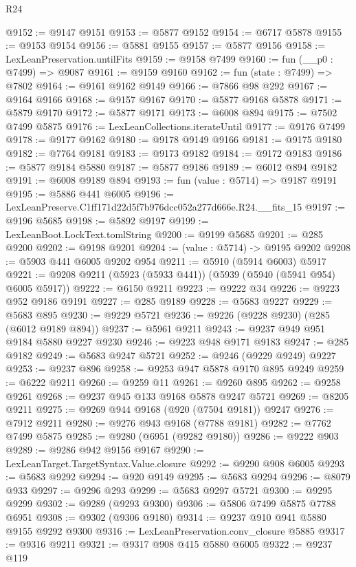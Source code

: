 \begin{lexlean}{R24}
\begin{coremodule}
@9152 := @9147 @9151
@9153 := @5877 @9152
@9154 := @6717 @5878
@9155 := @9153 @9154
@9156 := @5881 @9155
@9157 := @5877 @9156
@9158 := LexLeanPreservation.untilFits
@9159 := @9158 @7499
@9160 := fun (__p0 : @7499) => @9087
@9161 := @9159 @9160
@9162 := fun (state : @7499) => @7802
@9164 := @9161 @9162 @9149
@9166 := @7866 @98 @292
@9167 := @9164 @9166
@9168 := @9157 @9167
@9170 := @5877 @9168 @5878
@9171 := @5879 @9170
@9172 := @5877 @9171
@9173 := @6008 @894
@9175 := @7502 @7499 @5875
@9176 := LexLeanCollections.iterateUntil
@9177 := @9176 @7499
@9178 := @9177 @9162
@9180 := @9178 @9149 @9166
@9181 := @9175 @9180
@9182 := @7764 @9181
@9183 := @9173 @9182
@9184 := @9172 @9183
@9186 := @5877 @9184 @5880
@9187 := @5877 @9186
@9189 := @6012 @894 @9182
@9191 := @6008 @9189 @894
@9193 := fun (value : @5714) => @9187 @9191
@9195 := @5886 @441 @6005
@9196 := LexLeanPreserve.C1ff171d22d5f7b976dcc052a277d666e.R24.__fits_15
@9197 := @9196 @5685
@9198 := @5892 @9197
@9199 := LexLeanBoot.LockText.tomlString
@9200 := @9199 @5685
@9201 := @285 @9200
@9202 := @9198 @9201
@9204 := (value : @5714) -> @9195 @9202
@9208 := @5903 @441 @6005 @9202 @954
@9211 := @5910 (@5914 @6003) @5917
@9221 := @9208 @9211 (@5923 (@5933 @441)) (@5939 (@5940 (@5941 @954) @6005 @5917))
@9222 := @6150 @9211
@9223 := @9222 @34
@9226 := @9223 @952 @9186 @9191
@9227 := @285 @9189
@9228 := @5683 @9227
@9229 := @5683 @895
@9230 := @9229 @5721
@9236 := @9226 (@9228 @9230) (@285 (@6012 @9189 @894))
@9237 := @5961 @9211
@9243 := @9237 @949 @951 @9184 @5880 @9227 @9230
@9246 := @9223 @948 @9171 @9183
@9247 := @285 @9182
@9249 := @5683 @9247 @5721
@9252 := @9246 (@9229 @9249) @9227
@9253 := @9237 @896
@9258 := @9253 @947 @5878 @9170 @895 @9249
@9259 := @6222 @9211
@9260 := @9259 @11
@9261 := @9260 @895
@9262 := @9258 @9261
@9268 := @9237 @945 @133 @9168 @5878 @9247 @5721
@9269 := @8205 @9211
@9275 := @9269 @944 @9168 (@920 (@7504 @9181)) @9247
@9276 := @7912 @9211
@9280 := @9276 @943 @9168 (@7788 @9181)
@9282 := @7762 @7499 @5875
@9285 := @9280 (@6951 (@9282 @9180))
@9286 := @9222 @903
@9289 := @9286 @942 @9156 @9167
@9290 := LexLeanTarget.TargetSyntax.Value.closure
@9292 := @9290 @908 @6005
@9293 := @5683 @9292
@9294 := @920 @9149
@9295 := @5683 @9294
@9296 := @8079 @933
@9297 := @9296 @293
@9299 := @5683 @9297 @5721
@9300 := @9295 @9299
@9302 := @9289 (@9293 @9300)
@9306 := @5806 @7499 @5875 @7788 @6951
@9308 := @9302 (@9306 @9180)
@9314 := @9237 @910 @941 @5880 @9155 @9292 @9300
@9316 := LexLeanPreservation.conv_closure @5885
@9317 := @9316 @9211
@9321 := @9317 @908 @415 @5880 @6005
@9322 := @9237 @119

\end{coremodule}
\end{lexlean}
